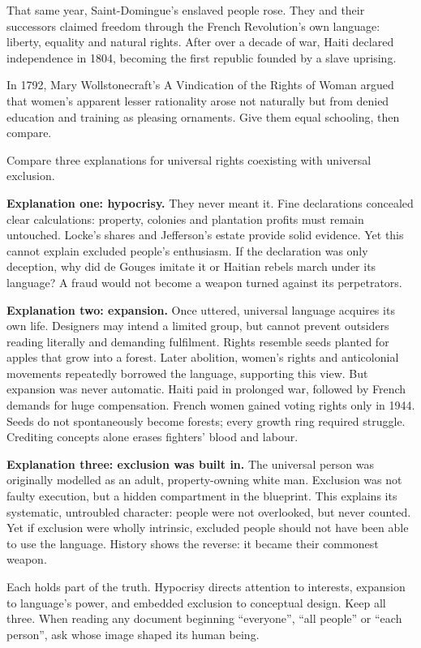 That same year, Saint-Domingue's enslaved people rose. They and their successors claimed freedom through the French Revolution's own language: liberty, equality and natural rights. After over a decade of war, Haiti declared independence in 1804, becoming the first republic founded by a slave uprising.

In 1792, Mary Wollstonecraft's A Vindication of the Rights of Woman argued that women's apparent lesser rationality arose not naturally but from denied education and training as pleasing ornaments. Give them equal schooling, then compare.

Compare three explanations for universal rights coexisting with universal exclusion.

\textbf{Explanation one: hypocrisy.} They never meant it. Fine declarations concealed clear calculations: property, colonies and plantation profits must remain untouched. Locke's shares and Jefferson's estate provide solid evidence. Yet this cannot explain excluded people's enthusiasm. If the declaration was only deception, why did de Gouges imitate it or Haitian rebels march under its language? A fraud would not become a weapon turned against its perpetrators.

\textbf{Explanation two: expansion.} Once uttered, universal language acquires its own life. Designers may intend a limited group, but cannot prevent outsiders reading literally and demanding fulfilment. Rights resemble seeds planted for apples that grow into a forest. Later abolition, women's rights and anticolonial movements repeatedly borrowed the language, supporting this view. But expansion was never automatic. Haiti paid in prolonged war, followed by French demands for huge compensation. French women gained voting rights only in 1944. Seeds do not spontaneously become forests; every growth ring required struggle. Crediting concepts alone erases fighters' blood and labour.

\textbf{Explanation three: exclusion was built in.} The universal person was originally modelled as an adult, property-owning white man. Exclusion was not faulty execution, but a hidden compartment in the blueprint. This explains its systematic, untroubled character: people were not overlooked, but never counted. Yet if exclusion were wholly intrinsic, excluded people should not have been able to use the language. History shows the reverse: it became their commonest weapon.

Each holds part of the truth. Hypocrisy directs attention to interests, expansion to language's power, and embedded exclusion to conceptual design. Keep all three. When reading any document beginning ``everyone'', ``all people'' or ``each person'', ask whose image shaped its human being.

